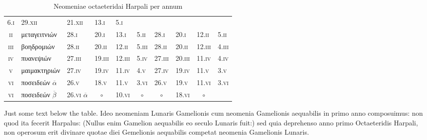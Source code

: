 \documentclass{book}
\begin{document}
\begin{table}[htbp]
\begin{tabular}{@{}cl llllllll@{}}
 6.\textsc{i} &
29.\textsc{xii} &
21.\textsc{xii} &
13.\textsc{i} &
 5.\textsc{i}
\\
\textsc{ii} & \textgreek{μεταγειτνιών} &
28.\textsc{i} &
20.\textsc{i} &
13.\textsc{i} &
 5.\textsc{ii} &
28.\textsc{i} &
20.\textsc{i} &
12.\textsc{ii} &
 5.\textsc{ii}
\\
\textsc{iii} & \textgreek{βοηδρομιών} &
28.\textsc{ii} &
20.\textsc{ii} &
12.\textsc{ii} &
 5.\textsc{iii} &
28.\textsc{ii} &
20.\textsc{ii} &
12.\textsc{iii} &
 4.\textsc{iii}
\\
\midrule
\textsc{iv} & \textgreek{πυανεψιών} &
27.\textsc{iii} &
19.\textsc{iii} &
12.\textsc{iii} &
 5.\textsc{iv} &
27.\textsc{iii} &
20.\textsc{iii} &
11.\textsc{iv} &
 4.\textsc{iv}
\\
\textsc{v} & \textgreek{μαιμακτηριών} &
27.\textsc{iv} &
19.\textsc{iv} &
11.\textsc{iv} &
 4.\textsc{v} &
27.\textsc{iv} &
19.\textsc{iv} &
11.\textsc{v} &
 3.\textsc{v}
\\
\textsc{vi} & \textgreek{ποσειδεών} $\overline{\alpha}$&
26.\textsc{v} &
18.\textsc{v} &
11.\textsc{v} &
 3.\textsc{vi} &
26.\textsc{v} &
19.\textsc{v} &
11.\textsc{vi} &
 3.\textsc{vi}
\\
\textsc{vi} & \textgreek{ποσειδεών} $\overline{\beta}$&
26.\textsc{vi} $\overline{\alpha}$ &
    \multicolumn{1}{c}{$\circ$} &
10.\textsc{vi} &
    \multicolumn{1}{c}{$\circ$} &
    \multicolumn{1}{c}{$\circ$} &
18.\textsc{vi} &
    \multicolumn{1}{c}{$\circ$} &
\multicolumn{1}{c}{~}\\
\bottomrule
\end{tabular}
\caption{Neomeniae octaeteridai Harpali per annum}
\end{table}

Just some text below the table.
Ideo neomeniam Lunaris Gamelionis cum neomenia
Gamelionis aequabilis in primo anno composuimus: non quod
ita fecerit Harpalus: (Nullus enim Gamelion aequabilis eo seculo
Lunaris fuit:) sed quia deprehenso anno primo Octaeteridis Harpali,
non operosum erit divinare quotae diei Gemelionis aequabilis
competat neomenia Gamelionis Lunaris.

\listoftables
\end{document}
